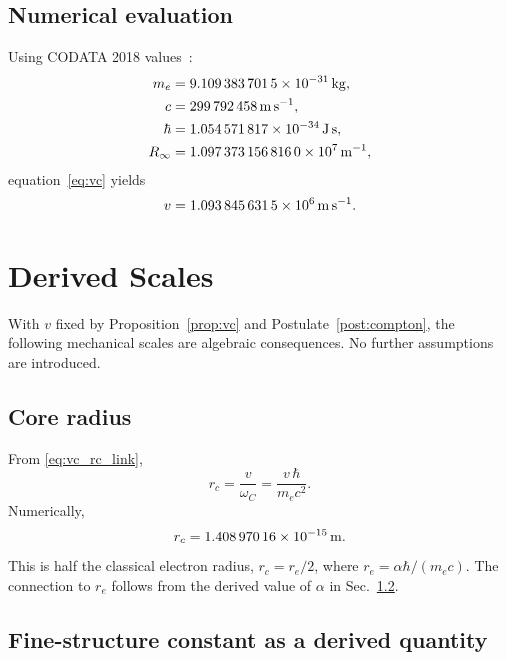 \documentclass[aps,pra,preprint,longbibliography,nofootinbib]{revtex4-2}
\newcommand{\vc}{v}              %
\newcommand{\rc}{r_c}            %
\newcommand{\omC}{\omega_C}      %
\newcommand{\Rinf}{R_\infty}     %
\begin{document}
\subsection{Numerical evaluation}
Using CODATA 2018 values~\cite{MohrTaylor2018}:
\begin{align}
  m_e   &= \SI{9.1093837015e-31}{\kilogram}, \notag\\
  c     &= \SI{299792458}{\meter\per\second}, \notag\\
  \hbar &= \SI{1.054571817e-34}{\joule\second}, \notag\\
  \Rinf &= \SI{1.0973731568160e7}{\per\meter}, \notag
\end{align}
equation~\eqref{eq:vc} yields
\begin{equation}
  \vc = \SI{1.093\,845\,631\,5e6}{\meter\per\second}.
  \label{eq:vc_numerical}
\end{equation}

\section{Derived Scales}
\label{sec:derived}

With $\vc$ fixed by Proposition~\ref{prop:vc} and
Postulate~\ref{post:compton}, the following mechanical scales
are algebraic consequences.
No further assumptions are introduced.

\subsection{Core radius}
\label{sec:rc}

From \eqref{eq:vc_rc_link},
\begin{equation}
  \rc = \frac{\vc}{\omC} = \frac{\vc\,\hbar}{m_e c^2}.
  \label{eq:rc}
\end{equation}
Numerically,
\begin{equation}
  \rc = \SI{1.408\,970\,16e-15}{\meter}.
  \label{eq:rc_numerical}
\end{equation}
This is half the classical electron radius, $\rc = r_e/2$, where
$r_e = \alpha\hbar/(m_e c)$.
The connection to $r_e$ follows from the derived value of $\alpha$
in Sec.~\ref{sec:alpha}.

\subsection{Fine-structure constant as a derived quantity}
\label{sec:alpha}
\end{document}
